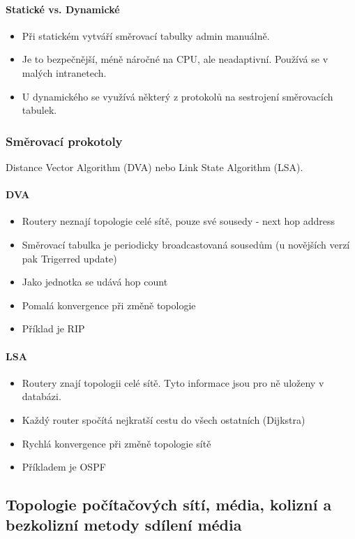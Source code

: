 \documentclass[10pt,a4paper]{article}
\begin{document}
\paragraph{Statické vs. Dynamické}
\begin{itemize}
\item Při statickém vytváří směrovací tabulky admin manuálně.
\item Je to bezpečnější, méně náročné na CPU, ale neadaptivní. Používá se v malých intranetech.
\item U dynamického se využívá některý z protokolů na sestrojení směrovacích tabulek.
\end{itemize}
\subsubsection{Směrovací prokotoly}
Distance Vector Algorithm (DVA) nebo Link State Algorithm (LSA).
\paragraph{DVA}
\begin{itemize}
\item Routery neznají topologie celé sítě, pouze své sousedy - next hop address
\item Směrovací tabulka je periodicky broadcastovaná sousedům (u novějších verzí pak Trigerred update)
\item Jako jednotka se udává hop count
\item Pomalá konvergence při změně topologie
\item Příklad je RIP
\end{itemize}
\paragraph{LSA}
\begin{itemize}
\item Routery znají topologii celé sítě. Tyto informace jsou pro ně uloženy v databázi.
\item Každý router spočítá nejkratší cestu do všech ostatních (Dijkstra)
\item Rychlá konvergence při změně topologie sítě
\item Příkladem je OSPF
\end{itemize}

\subsection{Topologie počítačových sítí, média, kolizní a bezkolizní metody sdílení média}
\end{document}
